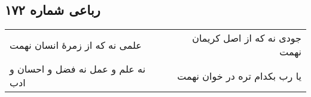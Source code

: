 \begin{center}
\section*{رباعی شماره ۱۷۲}
\label{sec:sh172}
\begin{longtable}{l p{0.5cm} r}
علمی نه که از زمرهٔ انسان نهمت
&&
جودی نه که از اصل کریمان نهمت
\\
نه علم و عمل نه فضل و احسان و ادب
&&
یا رب بکدام تره در خوان نهمت
\\
\end{longtable}
\end{center}
